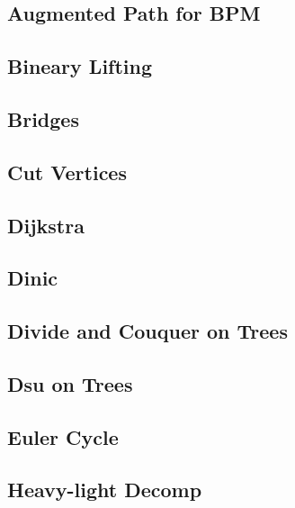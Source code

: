 \subsection{Augmented Path for BPM}
\raggedbottom
\subsection{Bineary Lifting}
\raggedbottom
\subsection{Bridges}
\raggedbottom
\subsection{Cut Vertices}
\raggedbottom
\subsection{Dijkstra}
\raggedbottom
\subsection{Dinic}
\raggedbottom
\subsection{Divide and Couquer on Trees}
\raggedbottom
\subsection{Dsu on Trees}
\raggedbottom
\subsection{Euler Cycle}
\raggedbottom
\subsection{Heavy-light Decomp}
\raggedbottom
